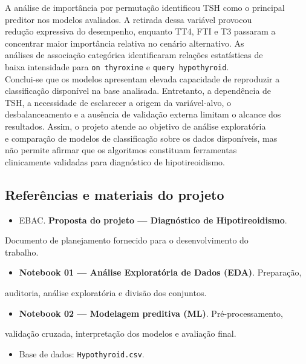 \documentclass{article}
\begin{document}
A análise de importância por permutação identificou TSH como o principal \\
preditor nos modelos avaliados. A retirada dessa variável provocou \\
redução expressiva do desempenho, enquanto TT4, FTI e T3 passaram a \\
concentrar maior importância relativa no cenário alternativo. As \\
análises de associação categórica identificaram relações estatísticas de \\
baixa intensidade para \texttt{on thyroxine} e \texttt{query hypothyroid}. \\

Conclui-se que os modelos apresentam elevada capacidade de reproduzir a \\
classificação disponível na base analisada. Entretanto, a dependência de \\
TSH, a necessidade de esclarecer a origem da variável-alvo, o \\
desbalanceamento e a ausência de validação externa limitam o alcance dos \\
resultados. Assim, o projeto atende ao objetivo de análise exploratória \\
e comparação de modelos de classificação sobre os dados disponíveis, mas \\
não permite afirmar que os algoritmos constituam ferramentas \\
clinicamente validadas para diagnóstico de hipotireoidismo. \\

\subsection{Referências e materiais do projeto}

\begin{itemize}
  \item   EBAC. \textbf{Proposta do projeto --- Diagnóstico de Hipotireoidismo}.
\end{itemize}
Documento de planejamento fornecido para o desenvolvimento do \\
trabalho. \\
\begin{itemize}
  \item   \textbf{Notebook 01 --- Análise Exploratória de Dados (EDA)}. Preparação,
\end{itemize}
auditoria, análise exploratória e divisão dos conjuntos. \\
\begin{itemize}
  \item   \textbf{Notebook 02 --- Modelagem preditiva (ML)}. Pré-processamento,
\end{itemize}
validação cruzada, interpretação dos modelos e avaliação final. \\
\begin{itemize}
  \item   Base de dados: \texttt{Hypothyroid.csv}.
\end{itemize}
\end{document}
